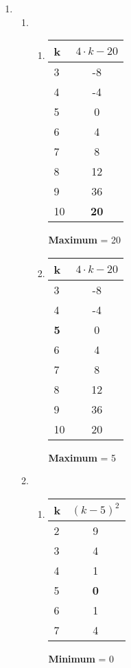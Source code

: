 \documentclass[a4paper]{article}
\begin{document}
\begin{enumerate}
		\item
		\begin{enumerate}
			\item
			\begin{enumerate}
				\item
				\begin{center}
					\begin{tabular}{|l|c|}
						\firsthline
							k & $4 \cdot k - 20$ \\
						\hline
							3 & -8 \\
							4 & -4 \\
							5 & 0 \\
							6 & 4 \\
							7 & 8 \\
							8 & 12 \\
							9 & 36 \\
							10 & \textbf{20} \\
						\hline
					\end{tabular}
					\newline
					\textbf{Maximum} = 20
				\end{center}
			
				\item
				\begin{center}
					\begin{tabular}{|l|c|}
						\firsthline
							k & $4 \cdot k - 20$ \\
						\hline
							3 & -8 \\
							4 & -4 \\
							\textbf{5} & 0 \\
							6 & 4 \\
							7 & 8 \\
							8 & 12 \\
							9 & 36 \\
							10 & 20 \\
						\hline
					\end{tabular}
					\newline
					\textbf{Maximum} = 5
				\end{center}
			\end{enumerate}
			\clearpage
			
			\item
			\begin{enumerate}
				\item
				\begin{center}
					\begin{tabular}{|l|c|}
						\firsthline
							k & $(k - 5)^{2}$ \\
						\hline
							2 & 9 \\
							3 & 4 \\
							4 & 1 \\
							5 & \textbf{0} \\
							6 & 1 \\
							7 & 4 \\
						\hline
					\end{tabular}
					\newline
					\textbf{Minimum} = 0
				\end{center}
				

\end{enumerate}
\end{enumerate}
\end{enumerate}
\end{document}
